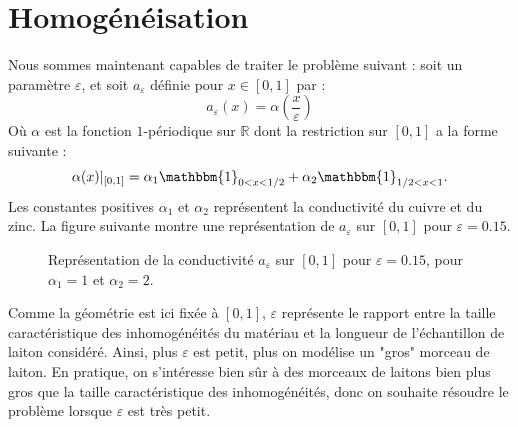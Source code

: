 \documentclass[11pt,a4paper]{article}
\begin{document}





\section{Homogénéisation}

Nous sommes maintenant capables de traiter le problème suivant : soit un paramètre $\varepsilon$, et soit $a_{\varepsilon}$ définie pour $x\in  [0,1]$ par : 
\[a_{\varepsilon}(x) = \alpha\left(\dfrac{x}{\varepsilon}\right) \]
Où $\alpha$ est la fonction $1$-périodique sur $\mathbb{R}$ dont la restriction sur $[0,1]$  a la forme suivante :
\[\alpha(x)|_{[0,1]} = \alpha_1\mathbbm{1}_{0<x<1/2}  +\alpha_2 \mathbbm{1}_{1/2<x<1}.\]
Les constantes positives $\alpha_1$ et $\alpha_2$ représentent la conductivité du cuivre et du zinc. 
La figure suivante montre une représentation de $a_\varepsilon$ sur $[0,1]$ pour $\varepsilon = 0.15$. 

\begin{figure}[width = 0.3\textwidth; H]
\centering
\begin{adjustbox}{width=0.7\textwidth}

\end{adjustbox}
\caption{Représentation de la conductivité $a_\varepsilon$ sur $[0,1]$ pour $\varepsilon = 0.15$, pour $\alpha_1 = 1$ et $\alpha_2 = 2$.}
\end{figure}

Comme la géométrie est ici fixée à $[0,1]$, $\varepsilon$ représente le rapport entre la taille caractéristique des inhomogénéités du matériau et la longueur de l'échantillon de laiton considéré. Ainsi, plus $\varepsilon$ est petit, plus on modélise un "gros" morceau de laiton. En pratique, on s'intéresse bien sûr à des morceaux de laitons bien plus gros que la taille caractéristique des inhomogénéités, donc on souhaite résoudre le problème lorsque $\varepsilon$ est très petit. 
\end{document}
